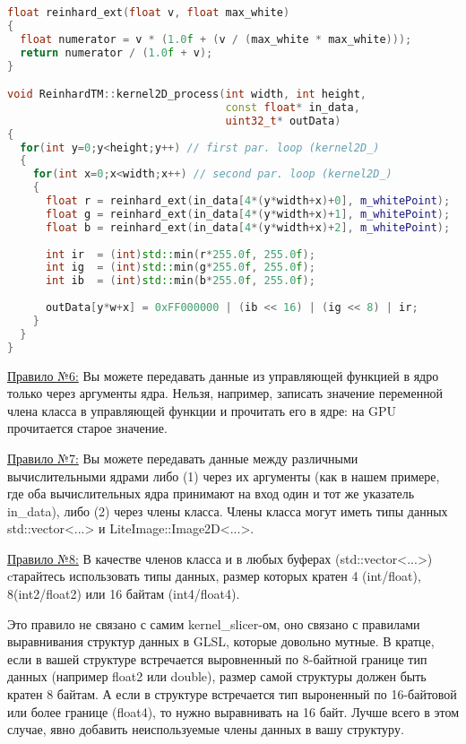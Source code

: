 \documentclass[11pt,fleqn,english,russian]{report} %
\begin{document}
\begin{lstlisting}[language=C++, 
	               caption=двумерное вычислительное ядро вызывает функцию reinhard\_ext, 
	               label=lst:kernel2D_process]	
float reinhard_ext(float v, float max_white)
{
  float numerator = v * (1.0f + (v / (max_white * max_white)));
  return numerator / (1.0f + v);
}

void ReinhardTM::kernel2D_process(int width, int height, 
                                  const float* in_data, 
                                  uint32_t* outData)
{
  for(int y=0;y<height;y++) // first par. loop (kernel2D_)
  {
    for(int x=0;x<width;x++) // second par. loop (kernel2D_)
    {
      float r = reinhard_ext(in_data[4*(y*width+x)+0], m_whitePoint);
      float g = reinhard_ext(in_data[4*(y*width+x)+1], m_whitePoint);
      float b = reinhard_ext(in_data[4*(y*width+x)+2], m_whitePoint);
			
      int ir  = (int)std::min(r*255.0f, 255.0f);
      int ig  = (int)std::min(g*255.0f, 255.0f);
      int ib  = (int)std::min(b*255.0f, 255.0f);
			
      outData[y*w+x] = 0xFF000000 | (ib << 16) | (ig << 8) | ir;
    }
  }
}
\end{lstlisting}


\underline{Правило №6:} Вы можете передавать данные из управляющей функцией в ядро только через аргументы ядра. Нельзя, например, записать значение переменной члена класса в управляющей функции и прочитать его в ядре: на GPU прочитается старое значение.

\underline{Правило №7:} Вы можете передавать данные между различными вычислительными ядрами либо (1) через их аргументы (как в нашем примере, где оба вычислительных ядра принимают на вход один и тот же указатель in\_data), либо (2) через члены класса. Члены класса могут иметь типы данных std::vector<...> и LiteImage::Image2D<...>.

\underline{Правило №8:} В качестве членов класса и в любых буферах (std::vector<...>) cтарайтесь использовать типы данных, размер которых кратен 4 (int/float), 8(int2/float2) или 16 байтам (int4/float4). 

\begin{remark}
Это правило не связано с самим kernel\_slicer-ом, оно связано с правилами выравнивания структур данных в GLSL, которые довольно мутные. В кратце, если в вашей структуре встречается выровненный по 8-байтной границе тип данных (например float2 или double), размер самой структуры должен быть кратен 8 байтам. А если в структуре встречается тип выроненный по 16-байтовой или более границе (float4), то нужно выравнивать на 16 байт. Лучше всего в этом случае, явно добавить неиспользуемые члены данных в вашу структуру.
\end{remark}
\end{document}
